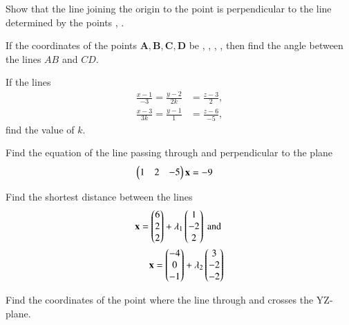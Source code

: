 %
\item Show that the line joining the origin to the point  is perpendicular to the line determined by the points , .
\item If the coordinates of the points $\bm{A}, \bm{B}, \bm{C}, \bm{D}$ be , , , , then find the angle between the lines $AB$ and $CD$.  
%
\item If the lines 
\begin{align}
\frac{x-1}{-3} = \frac{y-2}{2k} &= \frac{z-3}{2}, 
\\
\frac{x-3}{3k} = \frac{y-1}{1} &= \frac{z-6}{-5} ,
\end{align}
find the value of $k$.
\item Find the  equation of the line passing through  and perpendicular to the plane %
\begin{align}
\begin{pmatrix}1 & 2 & -5\end{pmatrix}\mathbf{x}&=-9
\end{align}
\item Find the shortest distance between the lines 
%
\begin{align}
\mathbf{x} = \begin{pmatrix}6 \\ 2 \\ 2\end{pmatrix} + \lambda_1 \begin{pmatrix}1 \\ -2 \\ 2\end{pmatrix}  \text{ and }
\\
\mathbf{x} = \begin{pmatrix}-4 \\ 0 \\ -1\end{pmatrix} + \lambda_2 \begin{pmatrix}3 \\ -2 \\ -2\end{pmatrix}  
\end{align}
%
\item Find the coordinates of the point where the line through  and  crosses the YZ-plane.
